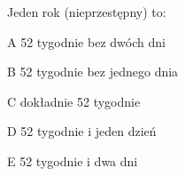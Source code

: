 \begin{tresc}
Jeden rok (nieprzestępny) to:
\end{tresc}
\begin{wariant}{A} 52 tygodnie bez dwóch dni \end{wariant}
\begin{wariant}{B} 52 tygodnie bez jednego dnia \end{wariant}
\begin{wariant}{C} dokładnie 52 tygodnie \end{wariant}
\begin{wariant}{D} 52 tygodnie i jeden dzień \end{wariant}
\begin{wariant}{E} 52 tygodnie i dwa dni \end{wariant}

